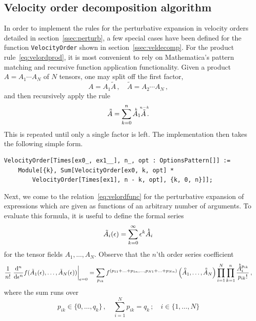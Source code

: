 \documentclass[notitlepage,a4paper,aps,prd,onecolumn,superscriptaddress,nofootinbib,groupedaddress,longbibliography]{revtex4-1}
\newcommand{\order}[2]{\accentset{#2}{#1}}
\newcommand{\dd}{\mathrm{d}}
\begin{document}
\subsection{Velocity order decomposition algorithm}\label{app:velalgo}
In order to implement the rules for the perturbative expansion in velocity orders detailed in section~\ref{ssec:perturb}, a few special cases have been defined for the function \lstinline/VelocityOrder/ shown in section~\ref{ssec:veldecomp}. For the product rule~\eqref{eq:velordprod}, it is most convenient to rely on Mathematica's pattern matching and recursive function application functionality. Given a product \(A = A_1 \cdots A_N\) of \(N\) tensors, one may split off the first factor,
\begin{equation}
A = A_1\tilde{A}\,, \quad \tilde{A} = A_2 \cdots A_N\,,
\end{equation}
and then recursively apply the rule
\begin{equation}
\order{A}{n} = \sum_{k = 0}^{n}\order{A}{k}_1\order{\tilde{A}}{n - k}\,.
\end{equation}
This is repeated until only a single factor is left. The implementation then takes the following simple form.
\begin{lstlisting}
VelocityOrder[Times[ex0_, ex1__], n_, opt : OptionsPattern[]] :=
	Module[{k}, Sum[VelocityOrder[ex0, k, opt] *
		VelocityOrder[Times[ex1], n - k, opt], {k, 0, n}]];
\end{lstlisting}
Next, we come to the relation~\eqref{eq:velordfunc} for the perturbative expansion of expressions which are given as functions of an arbitrary number of arguments. To evaluate this formula, it is useful to define the formal series
\begin{equation}
\tilde{A}_i(\epsilon) = \sum_{k = 0}^{\infty}\epsilon^k\order{A}{k}_i
\end{equation}
for the tensor fields \(A_1, \ldots, A_N\). Observe that the $n$'th order series coefficient
\begin{equation}
\frac{1}{n!}\left.\frac{\dd^n}{\dd\epsilon^n}f(\tilde{A}_1(\epsilon), \ldots, \tilde{A}_N(\epsilon))\right|_{\epsilon = 0} = \sum_{p_{ik}}f^{(p_{11} + \ldots + p_{1n}, \ldots, p_{N1} + \ldots + p_{Nn})}\left(\order{A}{0}_1, \ldots, \order{A}{0}_N\right)\prod_{i = 1}^{N}\prod_{k = 1}^{n}\frac{\order{A}{k}_i^{p_{ik}}}{p_{ik}!}\,,
\end{equation}
where the sum runs over
\begin{equation}
p_{ik} \in \{0, \ldots, q_k\}\,, \quad
\sum_{i = 1}^{N}p_{ik} = q_k\,; \quad
i \in \{1, \ldots, N\}
\end{equation}
\end{document}
